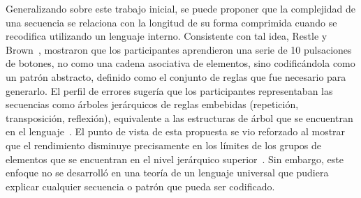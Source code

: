 
Generalizando sobre este trabajo inicial, se puede proponer que la complejidad de una secuencia se relaciona con la longitud de su forma comprimida cuando se recodifica utilizando un lenguaje interno. Consistente con tal idea, Restle y Brown~\cite{f36}, mostraron que los participantes aprendieron una serie de 10 pulsaciones de botones, no como una cadena asociativa de elementos, sino codificándola como un patrón abstracto, definido como el conjunto de reglas que fue necesario para generarlo. El perfil de errores sugería que los participantes representaban las secuencias como árboles jerárquicos de reglas embebidas (repetición, transposición, reflexión), equivalente a las estructuras de árbol que se encuentran en el lenguaje~\cite{f37}. El punto de vista de esta propuesta se vio reforzado al mostrar que el rendimiento disminuye precisamente en los límites de los grupos de elementos que se encuentran en el nivel jerárquico superior~\cite{f36,f37,f38}. Sin embargo, este enfoque no se desarrolló en una teoría de un lenguaje universal que pudiera explicar cualquier secuencia o patrón que pueda ser codificado.

